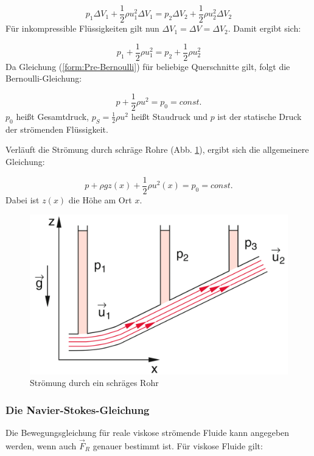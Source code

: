 \begin{equation}
p_1 \Delta V_1 + \frac{1}{2} \rho u_1^2 \Delta V_1 = p_2 \Delta V_2 + \frac{1}{2} \rho u_2^2 \Delta V_2
\end{equation}
Für inkompressible Flüssigkeiten gilt nun $ \Delta V_1 = \Delta V = \Delta V_2 $. Damit ergibt sich:

\begin{equation}
p_1 + \frac{1}{2} \rho u_1^2 = p_2 + \frac{1}{2} \rho u_2^2
\label{form:Pre-Bernoulli}
\end{equation}
Da Gleichung (\ref{form:Pre-Bernoulli}) für beliebige Querschnitte gilt, folgt die Bernoulli-Gleichung:

\begin{equation}
\boxed{p + \frac{1}{2} \rho u^2 = p_0 = const.}
\label{form:Bernoulli-Gleichung}
\end{equation}
$ p_0 $ heißt Gesamtdruck, $ p_S = \frac{1}{2} \rho u^2 $ heißt Staudruck und $p$ ist der statische Druck der strömenden Flüssigkeit.

Verläuft die Strömung durch schräge Rohre (Abb. \ref{fig:8-11}), ergibt sich die allgemeinere Gleichung:

\begin{equation}
p + \rho g z(x) + \frac{1}{2} \rho u^2(x) = p_0 = const.
\end{equation}
Dabei ist $z(x)$ die Höhe am Ort $x$.

\begin{figure}
	\centering
        \includegraphics[width=.9\textwidth]{images/8-11}
\caption{ Strömung durch ein schräges Rohr }
\label{fig:8-11}
\end{figure}

\subsubsection{Die Navier-Stokes-Gleichung}
Die Bewegungsgleichung für reale viskose strömende Fluide kann angegeben werden, wenn auch $ \vec{F}_R $ genauer bestimmt ist. Für viskose Fluide gilt:

